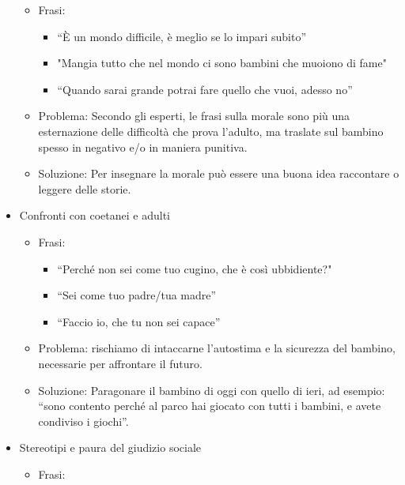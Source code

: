\documentclass[12pt]{book} %
\begin{document}
\begin{itemize}
\begin{itemize}
\item Frasi:

\begin{itemize}
\item “È un mondo difficile, è meglio se lo impari subito”
\item "Mangia tutto che nel mondo ci sono bambini che muoiono di fame"
\item “Quando sarai grande potrai fare quello che vuoi, adesso no”
\end{itemize}
\item Problema: Secondo gli esperti, le frasi sulla morale sono più una esternazione delle difficoltà che prova
l'adulto, ma traslate sul bambino spesso in negativo e/o in maniera punitiva.
\item Soluzione: Per insegnare la morale può essere una buona idea raccontare o leggere delle storie.
\end{itemize}
\item Confronti con coetanei e adulti

\begin{itemize}
\item Frasi:

\begin{itemize}
\item “Perché non sei come tuo cugino, che è così ubbidiente?"
\item “Sei come tuo padre/tua madre”
\item “Faccio io, che tu non sei capace”
\end{itemize}
\item Problema: rischiamo di intaccarne l'autostima e la sicurezza del bambino, necessarie per
affrontare il futuro. 
\item Soluzione: Paragonare il bambino di oggi con quello di ieri, ad esempio: “sono contento perché al parco hai
giocato con tutti i bambini, e avete condiviso i giochi”.
\end{itemize}
\item Stereotipi e paura del giudizio sociale

\begin{itemize}
\item Frasi:


\end{itemize}
\end{itemize}
\end{document}
